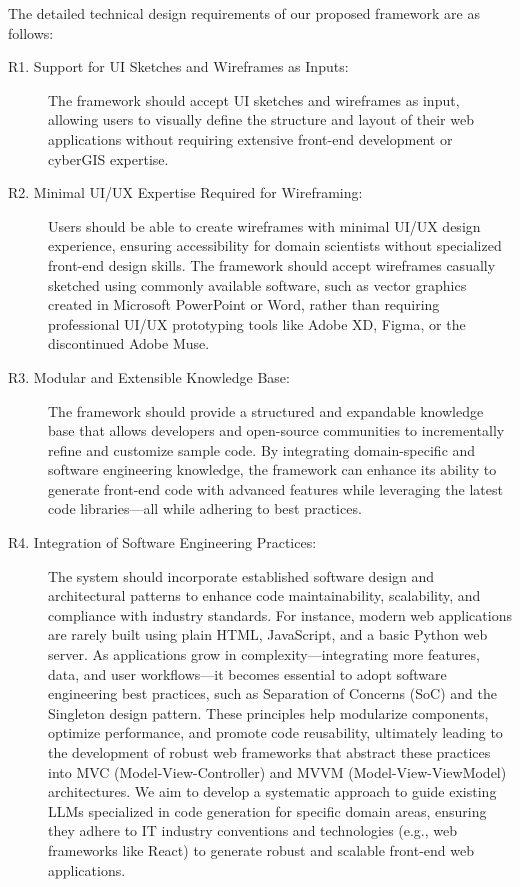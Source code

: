 The detailed technical design requirements of our proposed framework are as follows:
\begin{description}
    \item[R1. Support for UI Sketches and Wireframes as Inputs:]  
    The framework should accept UI sketches and wireframes as input, allowing users to visually define the structure and layout of their web applications without requiring extensive front-end development or cyberGIS expertise.
    
    \item[R2. Minimal UI/UX Expertise Required for Wireframing:]  
    Users should be able to create wireframes with minimal UI/UX design experience, ensuring accessibility for domain scientists without specialized front-end design skills. The framework should accept wireframes casually sketched using commonly available software, such as vector graphics created in Microsoft PowerPoint or Word, rather than requiring professional UI/UX prototyping tools like Adobe XD, Figma, or the discontinued Adobe Muse.
    
    \item[R3. Modular and Extensible Knowledge Base:]  
    The framework should provide a structured and expandable knowledge base that allows developers and open-source communities to incrementally refine and customize sample code. By integrating domain-specific and software engineering knowledge, the framework can enhance its ability to generate front-end code with advanced features while leveraging the latest code libraries—all while adhering to best practices.
    
    \item[R4. Integration of Software Engineering Practices:]  
    The system should incorporate established software design and architectural patterns to enhance code maintainability, scalability, and compliance with industry standards. For instance, modern web applications are rarely built using plain HTML, JavaScript, and a basic Python web server. As applications grow in complexity—integrating more features, data, and user workflows—it becomes essential to adopt software engineering best practices, such as Separation of Concerns (SoC) and the Singleton design pattern. These principles help modularize components, optimize performance, and promote code reusability, ultimately leading to the development of robust web frameworks that abstract these practices into MVC (Model-View-Controller) and MVVM (Model-View-ViewModel) architectures. We aim to develop a systematic approach to guide existing LLMs specialized in code generation for specific domain areas, ensuring they adhere to IT industry conventions and technologies (e.g., web frameworks like React) to generate robust and scalable front-end web applications.
    

\end{description}
